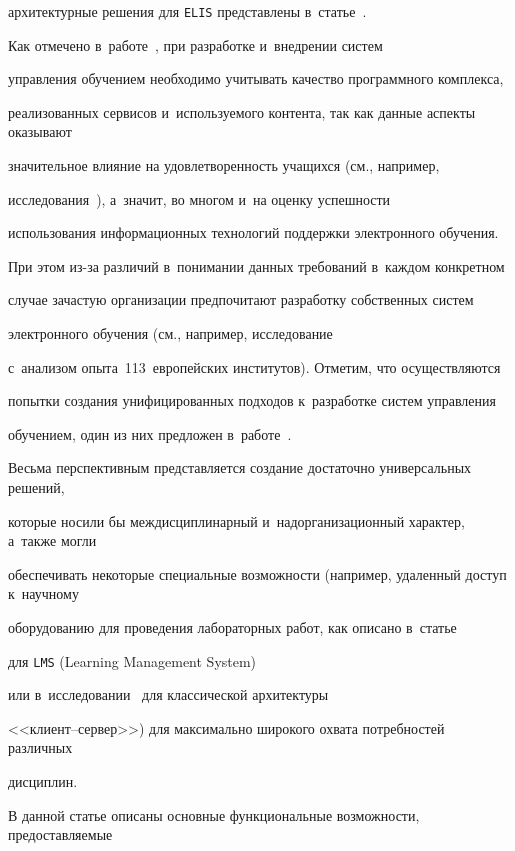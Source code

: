 архитектурные решения для \verb"ELIS" представлены в~статье~\cite{Gorshenin2017-2}.





Как отмечено в~работе~\cite{Ozkan2009-2}, при разработке и~внедрении сис\-тем 


управления обучением необходимо учитывать качество программного комплекса, 


реализованных сервисов и~используемого контента, так как данные аспекты оказывают 


значительное влияние на удовлетворенность учащихся (см., например, 


исследования~\cite{Sun2008-2,Liaw2008-2}), а~значит, во многом и~на оценку успешности 


использования информационных технологий поддержки электронного обучения. 


При этом из-за различий в~понимании данных требований в~каждом конкретном 


случае за\-час\-тую организации предпочитают разработку собственных сис\-тем 


электронного обучения (см., например, исследование~\cite{Paulsen2003-2} 


с~анализом опыта~113~европейских институтов). Отметим, что осуществляются 


попытки создания унифицированных подходов к~разработке сис\-тем управ\-ле\-ния 


обучением, один из них предложен в~работе~\cite{Avgeriou2003-2}. 


Весьма перспективным представляется создание достаточно универсальных решений, 


которые носили бы междисциплинарный и~надорганизационный характер, а~также могли 


обеспечивать некоторые специальные возможности (например, удаленный доступ к~научному 


оборудованию для проведения лабораторных работ, как описано в~статье~\cite{Rapuano2006-2} 


для \verb"LMS" (Learning Management System)


или в~исследовании~\cite{Callaghan2007-2} для классической архитектуры 


<<кли\-ент--сер\-вер>>) для максимально широкого охвата потребностей различных 


дисциплин.





В данной статье описаны основные функциональные возможности, предостав\-ляемые 



